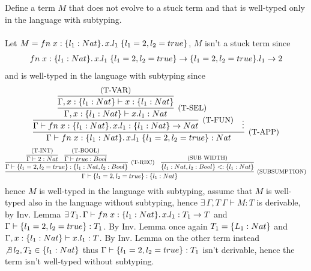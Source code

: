 \subsection{}

Define a term $M$ that does not evolve to a stuck term and that is well-typed only in the language
with subtyping.\\~\\
Let $M = fn\;x: \{l_1: Nat\}.\,x.l_1\;\{l_1 = 2, l_2 = true\}$, $M$ isn't a stuck term since
\begin{align*}
	fn\;x: \{l_1: Nat\}.\,x.l_1\;\{l_1 = 2, l_2 = true\} \to \{l_1 = 2, l_2 = true\}.l_1 \to 2
\end{align*}
and is well-typed in the language with subtyping since
\[
	\infer[\text{\small{(T-APP)}}]
	{ \Gamma \vdash \APP{\FN{x: \TREC{l_1: Nat}}{\SEL{x}{l_1}}}{\REC{l_1 = 2, l_2 = true}}: Nat }
	{
		\infer[\text{\small{(T-FUN)}}]
		{ \Gamma \vdash \FN{x: \TREC{l_1: Nat}}{\SEL{x}{l_1}}: \TREC{l_1: Nat} \to Nat }
		{
			\infer[\text{\small{(T-SEL)}}]
			{ \Gamma, x: \TREC{l_1: Nat} \vdash \SEL{x}{l_1}: Nat }
			{
				\infer{ \Gamma, x: \TREC{l_1: Nat} \vdash x: \TREC{l_1: Nat} }{\text{\small{(T-VAR)}}}
			}
		} &
		\vdots
	}
\]
\[
	\infer[\text{\small{(SUBSUMPTION)}}]
	{
		\Gamma \vdash \REC{l_1 = 2, l_2 = true}: \TREC{l_1: Nat}
	}
	{
		\infer[\text{\small{(T-REC)}}]
		{ \Gamma \vdash \REC{l_1 = 2, l_2 = true}: \TREC{l_1: Nat, l_2: Bool} }
		{
			\infer{ \Gamma \vdash 2: Nat }{\text{\small{(T-INT)}}} &
			\infer{ \Gamma \vdash true: Bool }{\text{\small{(T-BOOL)}}}
		} &
		\infer{\TREC{l_1: Nat, l_2: Bool} <: \TREC{l_1: Nat}}{\text{\small{(SUB WIDTH)}}}
	}
\]
hence $M$ is well-typed in the language with subtyping, assume that $M$ is well-typed also in the
language without subtyping, hence $\exists\, \Gamma, T\ \Gamma \vdash M: T$ is derivable, by
Inv. Lemma $\exists\, T_1.\, \Gamma \vdash fn\;x: \{l_1: Nat\}.\,x.l_1: T_1 \to T$ and
$\Gamma \vdash \{l_1 = 2, l_2 = true\}: T_1$. By Inv. Lemma once again $T_1 = \{L_1: Nat\}$
and $\Gamma, x: \{l_1: Nat\} \vdash x.l_1: T$.
By Inv. Lemma on the other term instead $\not\exists\, l_2, T_2 \in \{l_1: Nat\}$ thus
$\Gamma \vdash \{l_1 = 2, l_2 = true\}: T_1$ isn't derivable, hence the term isn't well-typed without subtyping.
